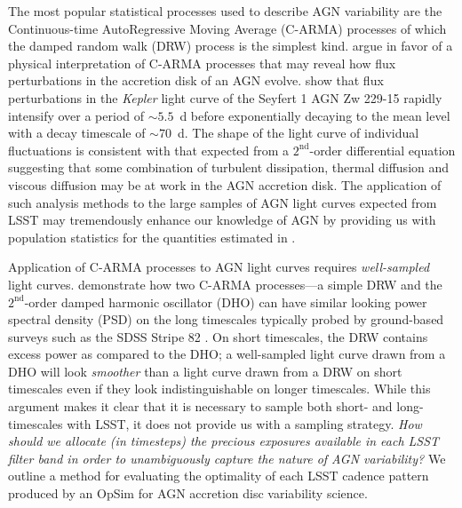\documentclass[times,preprint]{aastex}
\begin{document}
The most popular statistical processes used to describe AGN variability are the Continuous-time AutoRegressive Moving Average (C-ARMA) processes \citep{Kelly14, Brockwell14} of which the damped random walk (DRW) process \citep{Kelly09} is the simplest kind. \citet{KasliwalCARMA} argue in favor of a physical interpretation of C-ARMA processes that may reveal how flux perturbations in the accretion disk of an AGN evolve. \citet{KasliwalCARMA} show that flux perturbations in the \textit{Kepler} light curve of the Seyfert 1 AGN Zw 229-15 rapidly intensify over a period of $\sim 5.5$~d before exponentially decaying to the mean level with a decay timescale of $\sim 70$~d. The shape of the light curve of individual fluctuations is consistent with that expected from a $2^{\mathrm{nd}}$-order differential equation suggesting that some combination of turbulent dissipation, thermal diffusion and viscous diffusion may be at work in the AGN accretion disk. The application of such analysis methods to the large samples of AGN light curves expected from LSST may tremendously enhance our knowledge of AGN by providing us with population statistics for the quantities estimated in \citet{KasliwalCARMA}.

Application of C-ARMA processes to AGN light curves requires \textit{well-sampled} light curves. \citet{KasliwalCARMA} demonstrate how two C-ARMA processes---a simple DRW and the $2^{\mathrm{nd}}$-order damped harmonic oscillator (DHO) can have similar looking power spectral density (PSD) on the long timescales typically probed by ground-based surveys such as the SDSS Stripe 82 \citep{S82}. On short timescales, the DRW contains excess power as compared to the DHO; a well-sampled light curve drawn from a DHO will look \textit{smoother} than a light curve drawn from a DRW on short timescales even if they look indistinguishable on longer timescales. While this argument makes it clear that it is necessary to sample both short- and long-timescales with LSST, it does not provide us with a sampling strategy. \textit{How should we allocate (in timesteps) the precious exposures available in each LSST filter band in order to unambiguously capture the nature of AGN variability?}
We outline a method for evaluating the optimality of each LSST cadence pattern produced by an OpSim for AGN accretion disc variability science.
\end{document}
